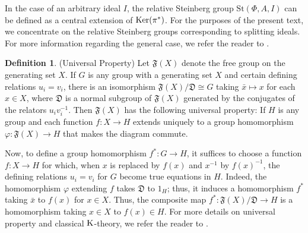 \documentclass[11pt]{amsart}
\theoremstyle{definition}
\newtheorem{defn}[thm]{Definition}
\numberwithin{equation}{section}
\numberwithin{equation}{section}
\newcommand{\Ker}{{\rm Ker}}
\newcommand{\<}{\langle}
\renewcommand{\>}{\rangle}
\newcommand{\K}{{\operatorname{\rm K}}}
\newcommand{\St}{\mathrm{St}}
\begin{document}
In the case of an arbitrary ideal $I$, the relative Steinberg group $\St(\Phi,A,I)$  can be defined as a central extension of $\Ker(\pi^{\ast})$. For the purposes of the present text, we concentrate on the relative Steinberg groups corresponding to splitting ideals. For more information regarding the general case, we refer the reader to \cite{Si16}.
\begin{defn}(Universal Property)
 Let $\mathfrak{F}(X)$ denote the free group on the generating set $X$. If $G$ is any group with a generating set $X$ and certain defining relations $u_i=v_i$, there is an isomorphism $\mathfrak{F}(X)/\mathfrak{D}\cong G$ taking $\bar{x}\mapsto x$ for each $x\in X$, where $\mathfrak{D}$ is a normal subgroup of $\mathfrak{F}(X)$ generated by the
conjugates of the relators $u_iv_i^{-1}$. Then $\mathfrak{F}(X)$ has the following universal property: If $H$ is any group and each function $f: X\to H$ extends uniquely to a group homomorphism $\varphi:\mathfrak{F}(X)\to H$ that makes the diagram commute.
\begin{center}
\end{center}\label{defn_uniprop}
\end{defn}
Now, to define a group homomorphism $f^{*}:G\to H$, it suffices to choose a function $f: X\to H$ for
which, when $x$ is replaced by $f(x)$ and $x^{-1}$ by $f(x)^{-1}$, the defining relations $u_i=v_i$ for $G$ become true equations in $H$. Indeed, the homomorphism $\varphi$ extending $f$ takes $\mathfrak{D}$ to $1_{H}$; thus, it induces a homomorphism $f^{*}$ taking $\bar{x}$ to $f(x)$ for $x\in X$. Thus, the composite map $f^{*}:\mathfrak{F}(X)/\mathfrak{D}\to H$ is a homomorphism taking $x\in X$ to $f(x)\in H$. For more details on universal property and classical $\K$-theory, we refer the reader to \cite{HaMe89}.
\end{document}
